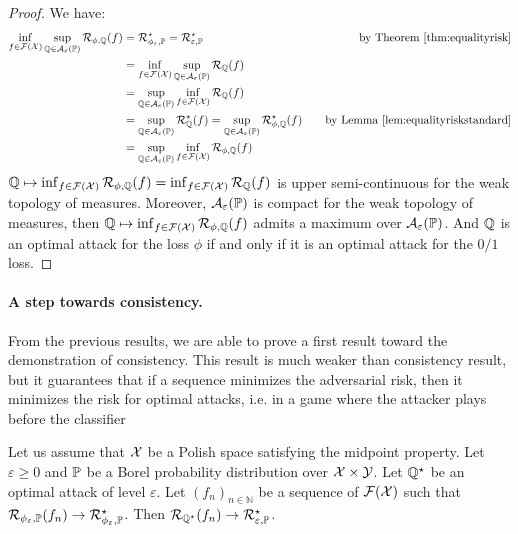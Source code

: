 \begin{proof}
    We have:
    \begin{align*}
         \inf_{f\in\mathcal{F}(\mathcal{X})}\sup_{\mathbb{Q}\in\mathcal{A}_\varepsilon(\mathbb{P})} \mathcal{R}_{\phi,\mathbb{Q}}(f) &= \mathcal{R}_{\phi_\varepsilon,\mathbb{P}}^\star = \mathcal{R}_{\varepsilon,\mathbb{P}}^\star&\quad\text{by Theorem~\ref{thm:equalityrisk}} \\
         &=\inf_{f\in\mathcal{F}(\mathcal{X})}\sup_{\mathbb{Q}\in\mathcal{A}_\varepsilon(\mathbb{P})} \mathcal{R}_{\mathbb{Q}}(f) \\
         &= \sup_{\mathbb{Q}\in\mathcal{A}_\varepsilon(\mathbb{P})} \inf_{f\in\mathcal{F}(\mathcal{X})}\mathcal{R}_{\mathbb{Q}}(f)\\
         &=\sup_{\mathbb{Q}\in\mathcal{A}_\varepsilon(\mathbb{P})} \mathcal{R}^\star_{\mathbb{Q}}(f) = \sup_{\mathbb{Q}\in\mathcal{A}_\varepsilon(\mathbb{P})} \mathcal{R}^\star_{\phi,\mathbb{Q}}(f)&\quad\text{by Lemma~\ref{lem:equalityriskstandard}}\\
        & =  \sup_{\mathbb{Q}\in\mathcal{A}_\varepsilon(\mathbb{P})}\inf_{f\in\mathcal{F}(\mathcal{X})} \mathcal{R}_{\phi,\mathbb{Q}}(f)\\
    \end{align*}
 $\mathbb{Q}\mapsto\inf_{f\in\mathcal{F}(\mathcal{X})}\mathcal{R}_{\phi,\mathbb{Q}}(f) =\inf_{f\in\mathcal{F}(\mathcal{X})}\mathcal{R}_{\mathbb{Q}}(f)  $ is  upper semi-continuous for the weak topology of measures. Moreover, $\mathcal{A}_\varepsilon(\mathbb{P})$ is compact for the weak topology of measures, then $\mathbb{Q}\mapsto\inf_{f\in\mathcal{F}(\mathcal{X})}\mathcal{R}_{\phi,\mathbb{Q}}(f)$ admits a maximum over  $\mathcal{A}_\varepsilon(\mathbb{P})$. And  $\mathbb{Q}$ is an optimal attack for the loss $\phi$  if and only if it is an optimal attack for the $0/1$ loss.
    \end{proof}
    

\paragraph{A step towards consistency.} From the previous results, we are able to prove a first result toward the demonstration of consistency. This result is much weaker than consistency result, but it guarantees that if a sequence minimizes the adversarial risk, then it minimizes the risk for optimal attacks, i.e. in a game where the attacker plays before the classifier
\begin{prop}
\label{prop:pseudo}
Let us assume that $\mathcal{X}$ be a Polish space satisfying the midpoint property. Let $\varepsilon\geq 0$ and $\mathbb{P}$ be a Borel probability distribution over $\mathcal{X}\times\mathcal{Y}$.  Let $\mathbb{Q}^\star$ be an optimal attack of level $\varepsilon$. Let $(f_n)_{n\in\mathbb{N}}$ be a sequence of $\mathcal{F}(\mathcal{X})$ such that $\mathcal{R}_{\phi_\varepsilon,\mathbb{P}}(f_n)\to\mathcal{R}_{\phi_\varepsilon,\mathbb{P}}^\star$. Then $\mathcal{R}_{\mathbb{Q}^\star}(f_n)\to\mathcal{R}_{\varepsilon,\mathbb{P}}^\star$.
\end{prop}

